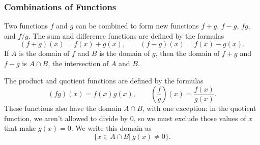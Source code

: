 \begin{frame}
\frametitle{Combinations of Functions}
Two functions $f$ and $g$ can be combined to form new functions $f+g$, $f-g$, $fg$, and $f/g$.  The sum and difference functions are defined by the formulas
\[
(f+g)(x) = f(x) + g(x), \qquad (f-g)(x) = f(x)-g(x).
\]
If $A$ is the domain of $f$ and $B$ is the domain of $g$, then the domain of $f+g$ and $f-g$ is $A\cap B$, the intersection of $A$ and $B$.

The product and quotient functions are defined by the formulas
\[
(fg)(x) = f(x)g(x), \qquad \left( \frac{f}{g}\right)(x) = \frac{f(x)}{g(x)}.
\]
These functions also have the domain $A\cap B$, with one exception: in the quotient function, we aren't allowed to divide by 0, so we must exclude those values of $x$ that make $g(x) = 0$.  We write this domain as
\[
\{ x\in A\cap B | \ g(x) \neq 0\} .
\]
\end{frame}

